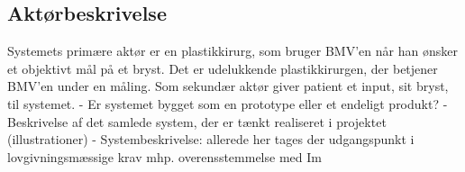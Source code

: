 		\subsection{Aktørbeskrivelse}
		Systemets primære aktør er en plastikkirurg, som bruger BMV'en når han ønsker et objektivt mål på et bryst. Det er udelukkende plastikkirurgen, der  betjener BMV'en under en måling. Som sekundær aktør giver patient et input, sit bryst, til systemet. 
- Er systemet bygget som en prototype eller et endeligt produkt? 
- Beskrivelse af det samlede system, der er tænkt realiseret i projektet (illustrationer)
- Systembeskrivelse: allerede her tages der udgangspunkt i lovgivningsmæssige krav mhp. overensstemmelse med Im

